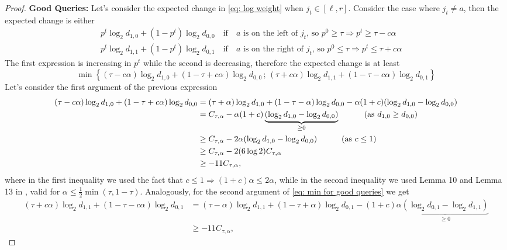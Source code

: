 \begin{proof}
{\bf Good Queries:} Let's consider the expected change in \autoref{eq: log weight} when $j_t \in [\ell, r]$. Consider the case where $j_t \neq a$, then the expected change is either
\begin{align*}
    &p^t \log_2 d_{1,0} +(1-p^t) \log_2 d_{0,0} \quad  \text{if}  \quad \text{$a$ is on the left of $j_t$, so $p^{0}\geq \tau \Rightarrow p^t \geq \tau-c\alpha$}\\
    &p^t \log_2 d_{1,1} +(1-p^t) \log_2 d_{0,1} \quad  \text{if} \quad  \text{$a$ is on the right of $j_t$, so $p^{0}\leq \tau \Rightarrow p^t \leq \tau+c\alpha\qquad$}
\end{align*}
The first expression is increasing in $p^t$ while the second is decreasing, therefore the expected change is at least
\begin{equation}\label{eq: min for good queries}
    \min\left\{(\tau-c\alpha) \log_2 d_{1,0} +(1-\tau+c\alpha) \log_2 d_{0,0}\,;\,(\tau+c\alpha) \log_2 d_{1,1} +(1-\tau-c\alpha) \log_2 d_{0,1}\right\}
\end{equation}
Let's consider the first argument of the previous expression
\begin{align*}
    (\tau-c\alpha) \log_2 d_{1,0} +(1-\tau+c\alpha) \log_2 d_{0,0} &=(\tau+\alpha) \log_2 d_{1,0} +(1-\tau-\alpha) \log_2 d_{0,0}-\alpha(1+c)(\log_2 d_{1,0}-\log_2 d_{0,0})\\
    &= C_{\tau, \alpha} -\alpha(1+c)\underbrace{(\log_2 d_{1,0}-\log_2 d_{0,0})}_{\geq 0} \quad \tag{as  $d_{1,0}\geq d_{0,0}$}\\
    &\geq C_{\tau, \alpha}-2\alpha (\log_2 d_{1,0}-\log_2 d_{0,0}) \quad \tag{as  $c\leq 1$}\\
    & \geq C_{\tau, \alpha}-2(6\log 2)C_{\tau, \alpha}\\
    & \geq -11 C_{\tau, \alpha},
\end{align*}
where in the first inequality we used the fact that $c\leq 1 \Rightarrow (1+c)\alpha\leq 2\alpha$, while in the second inequality we used Lemma 10 and Lemma 13 in \cite{gretta2023sharp}, valid for $\alpha \leq \frac{1}{2}\min(\tau, 1-\tau)$.
Analogously, for the second argument of \autoref{eq: min for good queries} we get
\begin{align*}
    (\tau + c\alpha)\log_2 d_{1,1} + (1-\tau-c\alpha)\log_2 d_{0,1} &=(\tau -\alpha)\log_2 d_{1,1} + (1-\tau+\alpha)\log_2 d_{0,1} -(1+c)\alpha\underbrace{(\log_2 d_{0,1}-\log_2 d_{1,1})}_{\geq 0}\\
    &\geq -11 C_{\tau, \alpha},
\end{align*}

\end{proof}
